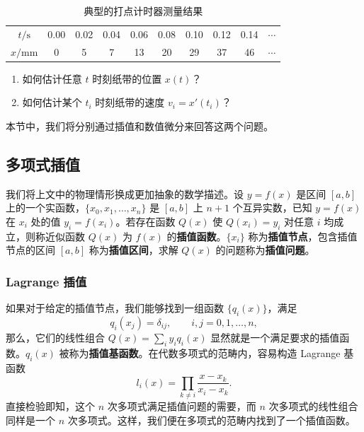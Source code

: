 \begin{table}[htbp]
\centering
\caption{典型的打点计时器测量结果}
\label{tab:ticker}
\begin{tabular}{c*{8}{c}c}
\toprule
$t/\mathrm{s}$ & 0.00 & 0.02 & 0.04 & 0.06 & 0.08 & 0.10 & 0.12 & 0.14 & $\cdots$\\
$x/\mathrm{mm}$ & 0 & 5 & 7 & 13 & 20 & 29 & 37 & 46 & $\cdots$\\
\bottomrule
\end{tabular}
\end{table}

\begin{enumerate}
\item 如何估计任意 $t$ 时刻纸带的位置 $x(t)$？
\item 如何估计某个 $t_i$ 时刻纸带的速度 $v_i=x'(t_i)$？
\end{enumerate}
本节中，我们将分别通过插值和数值微分来回答这两个问题。

\subsection{多项式插值}

我们将上文中的物理情形换成更加抽象的数学描述。设 $y=f(x)$ 是区间 $[a,b]$ 上的一个实函数，$\{x_0,x_1,\ldots,x_n\}$ 是 $[a,b]$ 上 $n+1$ 个互异实数，已知 $y=f(x)$ 在 $x_i$ 处的值 $y_i=f(x_i)$。若存在函数 $Q(x)$ 使 $Q(x_i)=y_i$ 对任意 $i$ 均成立，则称近似函数 $Q(x)$ 为 $f(x)$ 的\textbf{插值函数}。$\{x_i\}$ 称为\textbf{插值节点}，包含插值节点的区间 $[a,b]$ 称为\textbf{插值区间}，求解 $Q(x)$ 的问题称为\textbf{插值问题}。

\subsubsection{Lagrange 插值}

如果对于给定的插值节点，我们能够找到一组函数 $\{q_i(x)\}$，满足
\begin{equation}
 q_i(x_j)=\delta_{ij},\qquad i,j=0,1,\ldots,n,
\tag{2.1.1}
\end{equation}
那么，它们的线性组合 $Q(x)=\sum_i y_i q_i(x)$ 显然就是一个满足要求的插值函数。$q_i(x)$ 被称为\textbf{插值基函数}。在代数多项式的范畴内，容易构造 Lagrange 基函数
\begin{equation}
 l_i(x)=\prod_{k\ne i}\frac{x-x_k}{x_i-x_k}.
\tag{2.1.2}
\end{equation}
直接检验即知，这个 $n$ 次多项式满足插值问题的需要，而 $n$ 次多项式的线性组合同样是一个 $n$ 次多项式。这样，我们便在多项式的范畴内找到了一个插值函数。

